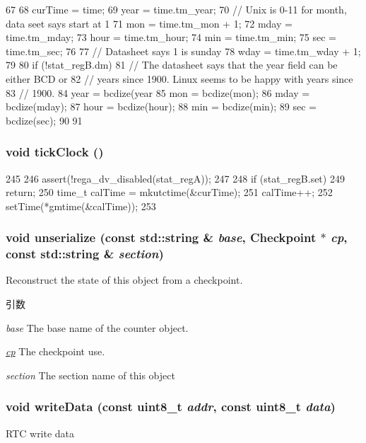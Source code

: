 \begin{DoxyCode}
67 {
68     curTime = time;
69     year = time.tm_year;
70     // Unix is 0-11 for month, data seet says start at 1
71     mon = time.tm_mon + 1;
72     mday = time.tm_mday;
73     hour = time.tm_hour;
74     min = time.tm_min;
75     sec = time.tm_sec;
76 
77     // Datasheet says 1 is sunday
78     wday = time.tm_wday + 1;
79 
80     if (!stat_regB.dm) {
81         // The datasheet says that the year field can be either BCD or
82         // years since 1900.  Linux seems to be happy with years since
83         // 1900.
84         year = bcdize(year %
85         mon = bcdize(mon);
86         mday = bcdize(mday);
87         hour = bcdize(hour);
88         min = bcdize(min);
89         sec = bcdize(sec);
90     }
91 }
\end{DoxyCode}
\hypertarget{classMC146818_a56fef941f638fcd7eb6c44ed7817bb24}{
\subsubsection[{tickClock}]{\setlength{\rightskip}{0pt plus 5cm}void tickClock ()}}
\label{classMC146818_a56fef941f638fcd7eb6c44ed7817bb24}



\begin{DoxyCode}
245 {
246     assert(!rega_dv_disabled(stat_regA));
247 
248     if (stat_regB.set)
249         return;
250     time_t calTime = mkutctime(&curTime);
251     calTime++;
252     setTime(*gmtime(&calTime));
253 }
\end{DoxyCode}
\hypertarget{classMC146818_a147c320e3d6506edf5587a40cd8e430d}{
\subsubsection[{unserialize}]{\setlength{\rightskip}{0pt plus 5cm}void unserialize (const std::string \& {\em base}, \/  {\bf Checkpoint} $\ast$ {\em cp}, \/  const std::string \& {\em section})}}
\label{classMC146818_a147c320e3d6506edf5587a40cd8e430d}
Reconstruct the state of this object from a checkpoint. 
\begin{DoxyParams}{引数}
\item[{\em base}]The base name of the counter object. \item[{\em \hyperlink{namespacecp}{cp}}]The checkpoint use. \item[{\em section}]The section name of this object \end{DoxyParams}
\hypertarget{classMC146818_a0322692b645738d2f01925d065dcab62}{
\subsubsection[{writeData}]{\setlength{\rightskip}{0pt plus 5cm}void writeData (const uint8\_\-t {\em addr}, \/  const uint8\_\-t {\em data})}}
\label{classMC146818_a0322692b645738d2f01925d065dcab62}
RTC write data 


